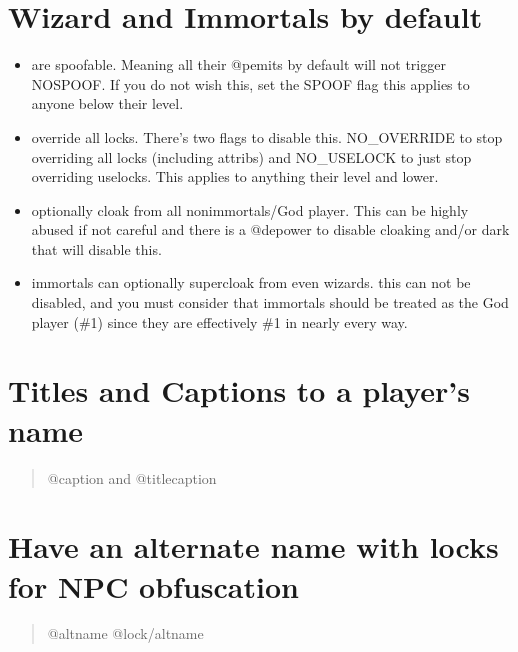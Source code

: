 \documentclass[letterpaper,10pt,english]{sphinxmanual}
\begin{document}
\section{Wizard and Immortals by default}
\label{\detokenize{features:wizard-and-immortals-by-default}}\begin{itemize}
\item {} 
\sphinxAtStartPar
are spoofable.  Meaning all their @pemits by default will not
trigger NOSPOOF.  If you do not wish this, set the SPOOF flag
this applies to anyone below their level.

\item {} 
\sphinxAtStartPar
override all locks.  There’s two flags to disable this.
NO\_OVERRIDE to stop overriding all locks (including attribs)
and NO\_USELOCK to just stop overriding uselocks.
This applies to anything their level and lower.

\item {} 
\sphinxAtStartPar
optionally cloak from all non\sphinxhyphen{}immortals/God player.
This can be highly abused if not careful and there
is a @depower to disable cloaking and/or dark that will
disable this.

\item {} 
\sphinxAtStartPar
immortals can optionally supercloak from even wizards.
this can not be disabled, and you must consider that immortals
should be treated as the God player (\#1) since they are
effectively \#1 in nearly every way.

\end{itemize}


\section{Titles and Captions to a player’s name}
\label{\detokenize{features:titles-and-captions-to-a-player-s-name}}\begin{quote}

\sphinxAtStartPar
@caption and @titlecaption
\end{quote}


\section{Have an alternate name with locks for NPC obfuscation}
\label{\detokenize{features:have-an-alternate-name-with-locks-for-npc-obfuscation}}\begin{quote}

\sphinxAtStartPar
@altname
@lock/altname
\end{quote}
\end{document}
